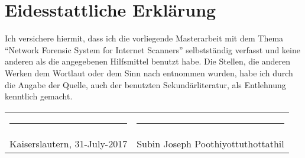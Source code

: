\chapter*{Eidesstattliche Erkl\"{a}rung}
\thispagestyle{empty}
Ich versichere hiermit, dass ich die vorliegende Masterarbeit mit dem Thema ``Network Forensic System for Internet Scanners'' selbstst\"{a}ndig verfasst und keine anderen als die angegebenen Hilfsmittel benutzt habe. Die Stellen, die anderen Werken dem Wortlaut oder dem Sinn nach entnommen wurden, habe ich durch die Angabe der Quelle, auch der benutzten Sekund\"{a}rliteratur, als Entlehnung kenntlich gemacht.

\vspace{3cm}
\noindent
\begin{tabular}{p{}p{}}
 \rule{0.4\textwidth}{1pt} & \rule{0.4\textwidth}{1pt}\\
Kaiserslautern, 31-July-2017 & Subin Joseph Poothiyottuthottathil
\end{tabular}